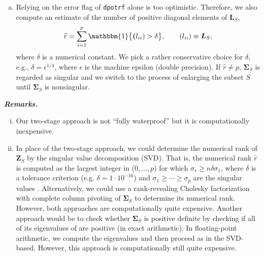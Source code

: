 \documentclass[a4paper,oneside,11pt,DIV=12]{scrartcl}
\newcommand{\code}[1]{{\texttt{#1}}}
\begin{document}
\begin{enumerate}[(1)]
\begin{enumerate}[a)]
		\item Relying on the error flag of \code{dpotrf} alone is too optimistic. Therefore, we also compute an estimate of the number of positive diagonal elements of $\bm L_S$,  
		\begin{equation}\label{eq:numericrank}
			\widehat{r} = \sum_{i=1}^p \mathbbm{1} \big\{ \bm (l_{ii}) > \delta \big\}, \qquad (l_{ii}) \equiv \bm L_S,
		\end{equation}
		\noindent where $\delta$ is a numerical constant. We pick a rather conservative choice for $\delta$, e.g., $\delta = \epsilon^{1/4}$, where $\epsilon$ is the machine epsilon (double precision). If $\widehat{r}\neq p$, $\bm \Sigma_S$ is regarded as singular and we switch to the process of enlarging the subset $S$ until $\bm \Sigma_S$ is nonsingular.  
	\end{enumerate}
\end{enumerate}

\vspace{1em}
\noindent\textbf{\sffamily \small \itshape Remarks.}
\vspace{-0.5em}
\begin{enumerate}[i)]
	\item Our two-stage approach is not ``fully waterproof'' but it is computationally inexpensive. 
	\item In place of the two-stage approach, we could determine the numerical rank of $\bm Z_S$ by the singular value decomposition (SVD). That is, the numerical rank $\widehat{r}$ is computed as the largest integer in ($0, \ldots, p$) for which $\sigma_r \geq n\delta \sigma_1$, where $\delta$ is a tolerance criterion (e.g. $\delta = 1 \cdot 10^{-16}$) and $\sigma_1 \geq \cdots \geq \sigma_p$ are the singular values \citep[][Chap. 2.5.5]{golub_loan_1996}. Alternatively, we could use a rank-revealing Cholesky factorization with complete column pivoting \citep[\code{LAPACK:} \code{dpstrf},][]{anderson_bai_etal_1999} of $\bm \Sigma_S$ to determine its numerical rank. However, both approaches are computationally quite expensive. Another approach would be to check whether $\bm \Sigma_S$ is positive definite by checking if all of its eigenvalues of are positive (in exact arithmetic). In floating-point arithmetic, we compute the eigenvalues \citep[\code{LAPACK}: \code{dsyev},][]{anderson_bai_etal_1999} and then proceed as in the SVD-based. However, this approach is computationally still quite expensive.
\end{enumerate}
\end{document}
